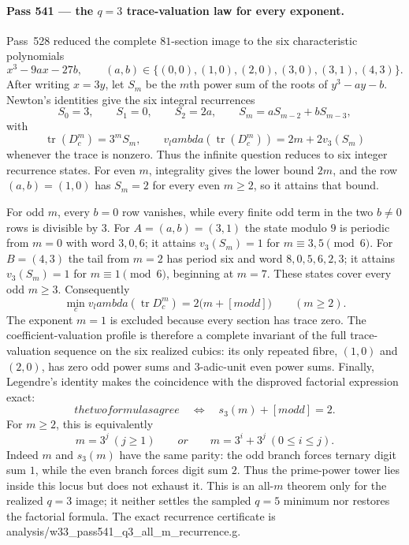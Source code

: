 \documentclass[12pt,a4paper]{article}
\def\texttt#1{#1}%
\def\text#1{#1}%
\def\lambda{lambda}%
\theoremstyle{definition}
\begin{document}
\paragraph{Pass 541 --- the $q=3$ trace-valuation law for every exponent.}
Pass~528 reduced the complete $81$-section image to the six characteristic
polynomials
\[
 x^3-9ax-27b,
 \qquad
 (a,b)\in\{(0,0),(1,0),(2,0),(3,0),(3,1),(4,3)\}.
\]
After writing $x=3y$, let $S_m$ be the $m$th power sum of the roots of
$y^3-ay-b$.  Newton's identities give the six integral recurrences
\[
 S_0=3,\qquad S_1=0,\qquad S_2=2a,\qquad
 S_m=aS_{m-2}+bS_{m-3},
\]
with
\[
 \operatorname{tr}(D_c^m)=3^mS_m,
 \qquad
 v_\lambda(\operatorname{tr}(D_c^m))=2m+2v_3(S_m)
\]
whenever the trace is nonzero.  Thus the infinite question reduces to six
integer recurrence states.  For even $m$, integrality gives the lower bound
$2m$, and the row $(a,b)=(1,0)$ has $S_m=2$ for every even $m\ge2$, so it
attains that bound.

For odd $m$, every $b=0$ row vanishes, while every finite odd term in the two
$b\ne0$ rows is divisible by $3$.  For $A=(a,b)=(3,1)$ the state modulo $9$
is periodic from $m=0$ with word $3,0,6$; it attains $v_3(S_m)=1$ for
$m\equiv3,5\pmod6$.  For $B=(4,3)$ the tail from $m=2$ has period six and
word $8,0,5,6,2,3$; it attains $v_3(S_m)=1$ for
$m\equiv1\pmod6$, beginning at $m=7$.  These states cover every odd
$m\ge3$.  Consequently
\[
 \boxed{\min_c v_\lambda\!\left(\operatorname{tr}D_c^m\right)
 =2\bigl(m+[m\text{ odd}]\bigr)\qquad(m\ge2).}
\]
The exponent $m=1$ is excluded because every section has trace zero.  The
coefficient-valuation profile is therefore a complete invariant of the full
trace-valuation sequence on the six realized cubics: its only repeated fibre,
$(1,0)$ and $(2,0)$, has zero odd power sums and $3$-adic-unit even power
sums.  Finally, Legendre's identity makes the coincidence with the disproved
factorial expression exact:
\[
 \text{the two formulas agree}
 \quad\Longleftrightarrow\quad
 s_3(m)+[m\text{ odd}]=2.
\]
For $m\ge2$, this is equivalently
\[
 m=3^j\ (j\ge1)
 \qquad\text{or}\qquad
 m=3^i+3^j\ (0\le i\le j).
\]
Indeed $m$ and $s_3(m)$ have the same parity: the odd branch forces ternary
digit sum $1$, while the even branch forces digit sum $2$.  Thus the
prime-power tower lies inside this locus but does not exhaust it.  This is
an all-$m$ theorem only for the realized $q=3$ image; it neither settles the
sampled $q=5$ minimum nor restores the factorial formula.  The exact recurrence
certificate is
\texttt{analysis/w33\_pass541\_q3\_all\_m\_recurrence.g}.




%
\end{document}
